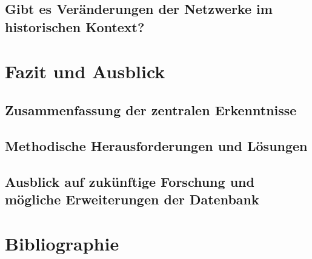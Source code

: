 \documentclass[12pt, a4paper, ngerman, bidi=default]{article}
\begin{document}
  \subsection{Gibt es Veränderungen der Netzwerke im historischen Kontext?}
  \newpage
\section{Fazit und Ausblick}
\subsection{Zusammenfassung der zentralen Erkenntnisse}
\subsection{Methodische Herausforderungen und Lösungen}
\subsection{Ausblick auf zukünftige Forschung und mögliche Erweiterungen der Datenbank}
\newpage
\section{Bibliographie}


\newpage{}
\end{document}
